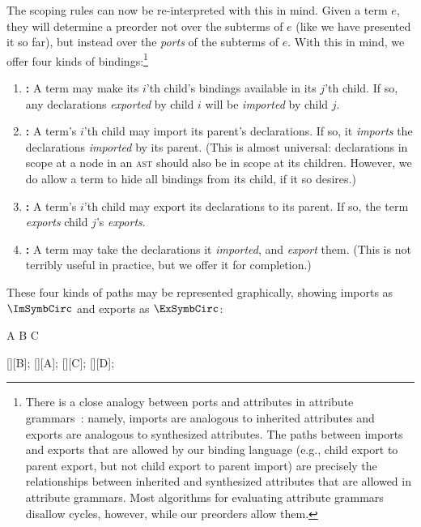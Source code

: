 The scoping rules can now be re-interpreted with this in mind. Given a
term $e$, they will determine a preorder not over the subterms of $e$
(like we have presented it so far), but instead over the \emph{ports}
of the subterms of $e$. With this in mind, we offer four kinds of bindings:\footnote{
  There is a close analogy between ports and attributes in attribute
  grammars~\cite{knuth-attribute-grammar}:
  namely, imports are analogous to inherited
  attributes and exports are analogous to synthesized attributes.
  The paths between imports and exports that are allowed by our
  binding language (e.g., child export to parent export, but not
  child export to parent import) are precisely the relationships
  between inherited and synthesized attributes that are allowed in
  attribute grammars. Most algorithms for evaluating attribute
  grammars disallow cycles, however, while our preorders allow them.
}
\begin{enumerate}
\item[A.] \textbf{:} A term may make its $i$'th child's bindings
  available in its $j$'th child. If so, any declarations
  \emph{exported} by child $i$ will be \emph{imported} by child $j$.
\item[B.] \textbf{:} A term's $i$'th child may import its
  parent's declarations. If so, it \emph{imports} the declarations \emph{imported}
  by its parent. (This is almost universal:
  declarations in scope at a node in an \textsc{ast} should
  also be in scope at its children. However, we do allow a term to
  hide all bindings from its child, if it so desires.)
\item[C.] \textbf{:} A term's $i$'th child may export its
  declarations to its parent. If so, the term \emph{exports} child $j$'s
  \emph{exports}.
\item[D.] \textbf{\SpecSelf:} A term may take the declarations it
  \emph{imported}, and \emph{export} them. (This is not terribly useful
  in practice, but we offer it for completion.)
\end{enumerate}
These four kinds of paths may be represented graphically,
showing imports as $\ImSymbCirc$ and exports as $\ExSymbCirc$:

\begin{center}
\begin{tikzScopeDiagram}
  \tikzRoot
    {A}{
      {B}{}
      {C}{}}
  \begin{tikzEdges}
    [][B];
    [][A];
    [][C];
    [][D];
  \end{tikzEdges}
\end{tikzScopeDiagram}
\end{center}

